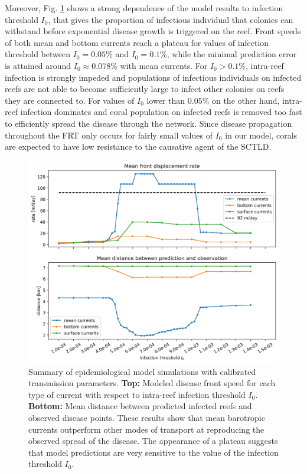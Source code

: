 \documentclass[utf8]{frontiersSCNS}
\begin{document}
Moreover, Fig. \ref{fig:results} shows a strong dependence of the model results to infection threshold $I_0$, that gives the proportion of infectious individual that colonies can withstand before exponential disease growth is triggered on the reef. Front speeds of both mean and bottom currents reach a plateau for values of infection threshold between $I_0=0.05\%$ and $I_0=0.1\%$, while the minimal prediction error is attained around $I_0 \approx 0.078\%$ with mean currents. For $I_0 > 0.1\%$, intra-reef infection is strongly impeded and populations of infectious individuals on infected reefs are not able to become sufficiently large to infect other colonies on reefs they are connected to. For values of $I_0$ lower than $0.05\%$ on the other hand, intra-reef infection dominates and coral population on infected reefs is removed too fast to efficiently spread the disease through the network. Since disease propagation throughout the FRT only occurs for fairly small values of $I_0$ in our model, corals are expected to have low resistance to the causative agent of the SCTLD. 

\begin{figure}
    \centering
    \includegraphics[width=.8\textwidth]{figures/sctld_validation_corrected.png}
    \caption{Summary of epidemiological model simulations with calibrated transmission parameters. \textbf{Top:} Modeled disease front speed for each type of current with respect to intra-reef infection threshold $I_0$. \textbf{Bottom:} Mean distance between predicted infected reefs and observed disease points. These results show that mean barotropic currents outperform other modes of transport at reproducing the observed spread of the disease. The appearance of a plateau suggests that model predictions are very sensitive to the value of the infection threshold $I_0$.}
    \label{fig:results}
\end{figure}
\end{document}
